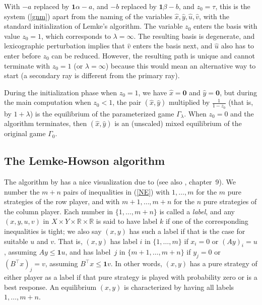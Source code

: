 \documentclass[a4paper,12pt]{article}  %
\theoremstyle{definition}
\def\reals{{\mathbb R}}
\newcommand{\T}{^{\top}}
\newcommand{\0}{{\mathbf0}}
\newcommand{\1}{{\mathbf1}}
\begin{document}
With $-a$ replaced by $\1\alpha-a$,
and $-b$ replaced by $\1\beta-b$,
and $z_0=\tau$, this is the system (\ref{gnm}) apart
from the naming of the variables $\hat x,\hat y,\hat u,\hat v$,
with the standard initialization of Lemke's algorithm.
The variable $z_0$ enters the basis with value $z_0=1$, which
corresponds to $\lambda=\infty$.
The resulting basis is degenerate, and lexicographic
perturbation implies that $\hat v$ enters the basis next,
and $\hat u$ also has to enter before $z_0$ can be reduced.
However, the resulting path is unique and cannot terminate
with $z_0=1$ (or $\lambda=\infty$) because this would mean
an alternative way to start (a secondary ray is different
from the primary ray). 

During the initialization phase when $z_0=1$, we have
$\hat x=\0$ and $\hat y=\0$, but during the main computation
when $z_0<1$, the pair $(\hat x,\hat y)$ multiplied by
$\frac1{1-z_0}$ (that is, by $1+\lambda$) is the equilibrium
of the parameterized game $\Gamma_\lambda$.
When $z_0=0$ and the algorithm terminates, then $(\hat
x,\hat y)$ is an (unscaled) mixed equilibrium of the
original game $\Gamma_0$.

\subsection{The Lemke-Howson algorithm}
\label{s-lh}

The algorithm by \citet{LH}
has a nice visualization due to \cite{Shapley1974}
(see also \citealp{vS22}, chapter~9).
We number the $m+n$ pairs of inequalities in (\ref{NE}) with
$1,\ldots,m$ for the $m$ pure strategies of the row player,
and with $m+1,\ldots,m+n$ for the $n$ pure strategies of the
column player. 
Each number in $\{1,\ldots,m+n\}$ is called a
\textit{label}, and any $(x,y,u,v)$ in
$X\times Y\times\reals\times\reals$ is said
to have label $k$ if one of the corresponding inequalities
is tight; we also say $(x,y)$ has such a label if that is
the case for suitable $u$ and $v$. 
That is, $(x,y)$ has label $i$ in $\{1,\ldots,m\}$ if
$x_i=0$ or $(Ay)_i=u$, assuming $Ay\le\1u$, and has
label~$j$ in $\{m+1,\ldots,m+n\}$ if $y_j=0$ or
$(B\T x)_j=v$, assuming $B\T x\le\1v$.
In other words, $(x,y)$ has a pure strategy of either player
as a label if that pure strategy is played with probability
zero or is a best response.
An equilibrium $(x,y)$ is characterized by having all labels
$1,\ldots,m+n$.
\end{document}
